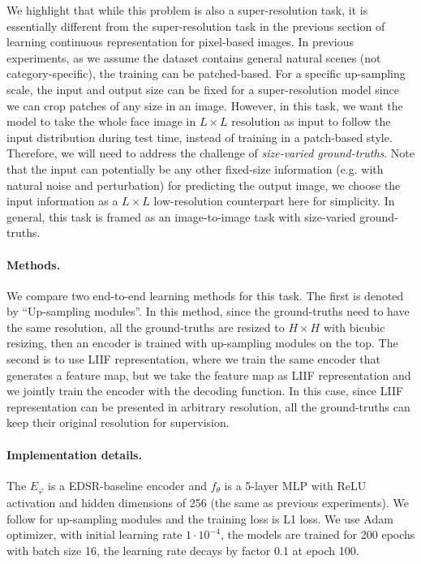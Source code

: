 \documentclass[final]{cvpr}
\begin{document}
We highlight that while this problem is also a super-resolution task, it is essentially different from the super-resolution task in the previous section of learning continuous representation for pixel-based images. In previous experiments, as we assume the dataset contains general natural scenes (not category-specific), the training can be patched-based. For a specific up-sampling scale, the input and output size can be fixed for a super-resolution model since we can crop patches of any size in an image. However, in this task, we want the model to take the whole face image in $L\times L$ resolution as input to follow the input distribution during test time, instead of training in a patch-based style. Therefore, we will need to address the challenge of \emph{size-varied ground-truths}. Note that the input can potentially be any other fixed-size information (e.g. with natural noise and perturbation) for predicting the output image, we choose the input information as a $L\times L$ low-resolution counterpart here for simplicity. In general, this task is framed as an image-to-image task with size-varied ground-truths.

\vspace{-1em}
\paragraph{Methods.} We compare two end-to-end learning methods for this task. The first is denoted by ``Up-sampling modules''. In this method, since the ground-truths need to have the same resolution, all the ground-truths are resized to $H\times H$ with bicubic resizing, then an encoder is trained with up-sampling modules on the top. The second is to use LIIF representation, where we train the same encoder that generates a feature map, but we take the feature map as LIIF representation and we jointly train the encoder with the decoding function. In this case, since LIIF representation can be presented in arbitrary resolution, all the ground-truths can keep their original resolution for supervision.

\vspace{-1em}
\paragraph{Implementation details.} The $E_\varphi$ is a EDSR-baseline encoder and $f_\theta$ is a 5-layer MLP with ReLU activation and hidden dimensions of 256 (the same as previous experiments). We follow \cite{lim2017enhanced} for up-sampling modules and the training loss is L1 loss. We use Adam~\cite{kingma2014adam} optimizer, with initial learning rate $1\cdot 10^{-4}$, the models are trained for 200 epochs with batch size 16, the learning rate decays by factor 0.1 at epoch 100.
\end{document}
